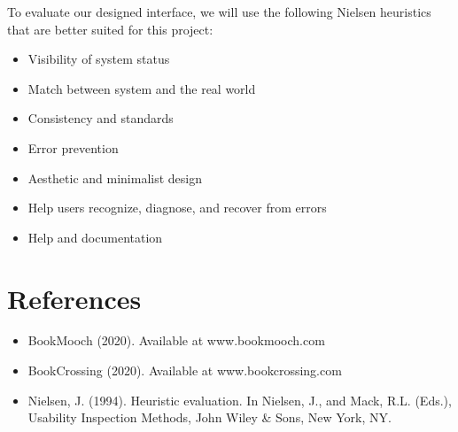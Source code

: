 \documentclass{article}
\begin{document}
To evaluate our designed interface, we will use the following Nielsen heuristics that are better suited for this project:
\begin{itemize}[itemsep=1pt, parsep=1pt]
    \item Visibility of system status
    \item Match between system and the real world
    \item Consistency and standards
    \item Error prevention
    \item Aesthetic and minimalist design
    \item Help users recognize, diagnose, and recover from errors
    \item Help and documentation
\end{itemize}

\section{References}
\begin{itemize}
    \item BookMooch (2020). Available at www.bookmooch.com
    \item BookCrossing (2020). Available at www.bookcrossing.com
    \item Nielsen, J. (1994). Heuristic evaluation. In Nielsen, J., and Mack, R.L. (Eds.), Usability Inspection Methods, John Wiley \& Sons, New York, NY.
\end{itemize}
\end{document}
